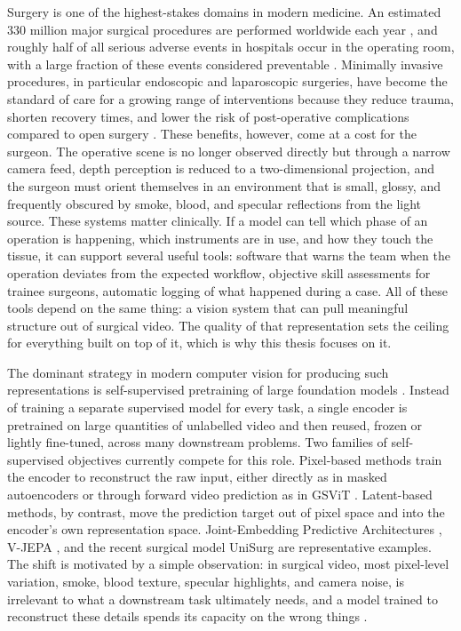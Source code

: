 \documentclass[11pt, a4paper]{article}
\begin{document}
Surgery is one of the highest-stakes domains in modern medicine. An estimated 330 million major surgical procedures are performed worldwide each year \parencite{mascagni-2022}, and roughly half of all serious adverse events in hospitals occur in the operating room, with a large fraction of these events considered preventable \parencite{Sameera2021Human}. Minimally invasive procedures, in particular endoscopic and laparoscopic surgeries, have become the standard of care for a growing range of interventions because they reduce trauma, shorten recovery times, and lower the risk of post-operative complications compared to open surgery \parencite{buia-2015}. These benefits, however, come at a cost for the surgeon. The operative scene is no longer observed directly but through a narrow camera feed, depth perception is reduced to a two-dimensional projection, and the surgeon must orient themselves in an environment that is small, glossy, and frequently obscured by smoke, blood, and specular reflections from the light source. These systems matter clinically. If a model can tell which phase of an operation is happening, which instruments are in use, and how they touch the tissue, it can support several useful tools: software that warns the team when the operation deviates from the expected workflow, objective skill assessments for trainee surgeons, automatic logging of what happened during a case. All of these tools depend on the same thing: a vision system that can pull meaningful structure out of surgical video. The quality of that representation sets the ceiling for everything built on top of it, which is why this thesis focuses on it.

The dominant strategy in modern computer vision for producing such representations is self-supervised pretraining of large foundation models \parencite{new-era-in-vision-2025}. Instead of training a separate supervised model for every task, a single encoder is pretrained on large quantities of unlabelled video and then reused, frozen or lightly fine-tuned, across many downstream problems. Two families of self-supervised objectives currently compete for this role. Pixel-based methods train the encoder to reconstruct the raw input, either directly as in masked autoencoders \parencite{he-2021} or through forward video prediction as in GSViT \parencite{schmidgall2024general}. Latent-based methods, by contrast, move the prediction target out of pixel space and into the encoder's own representation space. Joint-Embedding Predictive Architectures \parencite{LeCun2022APT}, V-JEPA \parencite{assran-2025}, and the recent surgical model UniSurg \parencite{wu-2026} are representative examples. The shift is motivated by a simple observation: in surgical video, most pixel-level variation, smoke, blood texture, specular highlights, and camera noise, is irrelevant to what a downstream task ultimately needs, and a model trained to reconstruct these details spends its capacity on the wrong things \parencite{wu-2026}.
\end{document}
